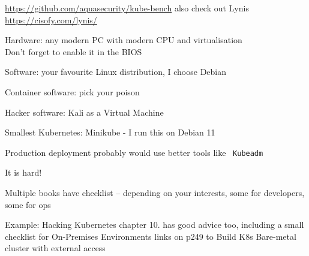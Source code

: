 \documentclass[Screen16to9,17pt]{foils}
\begin{document}
\begin{list2}
\item \url{https://github.com/aquasecurity/kube-bench} also check out Lynis \url{https://cisofy.com/lynis/}
\end{list2}






\begin{list2}
\item Hardware: any modern PC with modern CPU and virtualisation\\
Don't forget to enable it in the BIOS
\item Software: your favourite Linux distribution, I choose Debian
\item Container software: pick your poison
\item Hacker software: Kali as a Virtual Machine 
\item Smallest Kubernetes: Minikube -  I run this on Debian 11
\item Production deployment probably would use better tools like \faWrench\ \verb+Kubeadm+
\end{list2}





\begin{list2}
\item It is hard!
\item Multiple books have checklist -- depending on your interests, some for developers, some for ops
\item Example: Hacking Kubernetes chapter 10. has good advice too, including a small checklist for On-Premises Environments
links on p249 to Build K8s Bare-metal cluster with external access\\
\\
\\
\end{list2}


\myquestionspage

\end{document}
